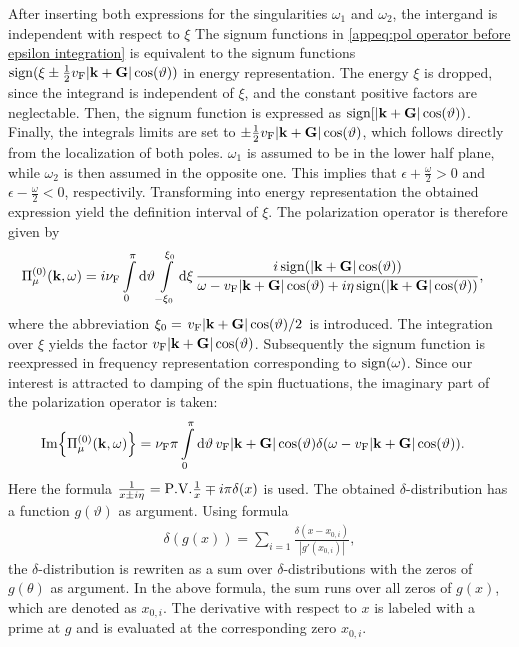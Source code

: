 After inserting both expressions for the singularities $\omega_{1}$ and $\omega_{2}$, the intergand is independent with respect to $\xi$
The signum functions in \eqref{appeq:pol operator before epsilon integration} is equivalent to the signum functions $\operatorname{sign}(\xi \pm \frac{1}{2} v_{\mathrm{F}} |\vb{k} + \vb{G}| \cos(\vartheta))$ in energy representation.
The energy $\xi$ is dropped, since the integrand is independent of $\xi$, and the constant positive factors are neglectable. 
Then, the signum function is expressed as $\operatorname{sign}[|\vb{k} + \vb{G}| \cos(\vartheta))$.
Finally, the integrals limits are set to $\pm \frac{1}{2} v_{\mathrm{F}} |\vb{k} + \vb{G}| \cos(\vartheta)$, which follows directly from the localization of both poles.
$\omega_{1}$ is assumed to be in the lower half plane, while $\omega_{2}$ is then assumed in the opposite one.
This implies that $\epsilon + \frac{\omega}{2} > 0$ and $\epsilon - \frac{\omega}{2} < 0$, respectivily.
Transforming into energy representation the obtained expression yield the definition interval of $\xi$.
The polarization operator is therefore given by
%
\begin{align}
	\Pi_{\mu}^{(0)}(\vb{k}, \omega) &= 
		i \nu_{\mathrm{F}}
		\int\limits_{0}^{\pi} \dd{\vartheta} 
		\int\limits_{-\xi_{0}}^{\xi_{0}} \dd{\xi}
		\frac{i \operatorname{sign}(|\vb{k} + \vb{G}| \cos(\vartheta))}{\omega - v_{\mathrm{F}} |\vb{k} + \vb{G}| \cos(\vartheta) + i\eta \operatorname{sign}(|\vb{k} + \vb{G}| \cos(\vartheta))},
\end{align}
%
where the abbreviation $\xi_{0} = \flatfrac{v_{\mt{F}}|\vb{k}+\vb{G}|\cos(\vartheta)}{2}$ is introduced.
The integration over $\xi$ yields the factor $v_{\mathrm{F}}|\vb{k}+\vb{G}|\cos(\vartheta)$.
Subsequently the signum function is reexpressed in frequency representation corresponding to $\operatorname{sign}(\omega)$.
Since our interest is attracted to damping of the spin fluctuations, the imaginary part of the polarization operator is taken:
%
\begin{align}
	\Im{\Pi_{\mu}^{(0)}(\vb{k}, \omega)} &= 
		\nu_{\mathrm{F}} \pi
		\int\limits_{0}^{\pi} \dd{\vartheta}
		v_{\mathrm{F}} |\vb{k}+\vb{G}| \cos(\vartheta) \delta(\omega - v_{\mathrm{F}} |\vb{k} + \vb{G}| \cos(\vartheta)).
	\label{appeq:imaginary part of pol operator before theta integration}
\end{align}
%
Here the formula $\frac{1}{x \pm i\eta} = \PV{\frac{1}{x}} \mp i \pi \delta(x)$ is used.
The obtained $\delta$-distribution has a function $g(\vartheta)$  as argument.
Using formula
%
\begin{align}
	\delta(g(x)) = \sum\limits_{i=1} \frac{\delta(x-x_{0,i})}{|g'(x_{0,i})|},
\end{align}
%
the $\delta$-distribution is rewriten as a sum over $\delta$-distributions with the zeros of $g(\theta)$ as argument.
In the above formula, the sum runs over all zeros of $g(x)$, which are denoted as $x_{0,i}$.
The derivative with respect to $x$ is labeled with a prime at $g$ and is evaluated at the corresponding zero $x_{0,i}$.

